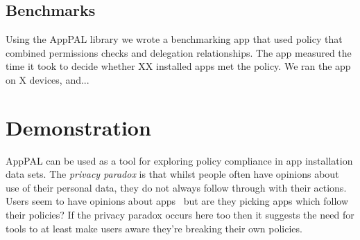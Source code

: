 \documentclass[]{llncs}
\begin{document}
%
%

\subsection{Benchmarks}
\label{ssec:benchmarks}

Using the AppPAL library we wrote a benchmarking app that used policy that combined permissions checks and delegation relationships.
The app measured the time it took to decide whether XX installed apps met the policy.
We ran the app on X devices, and...


\section{Demonstration}
\label{sec:demonstation}

AppPAL can be used as a tool for exploring policy compliance in app installation data sets.
The \emph{privacy paradox} is that whilst people often have opinions about use of their personal data, they do not always follow through with their actions.
Users seem to have opinions about apps~\cite{Sadeh:2014vq} but are they picking apps which follow their policies?
If the privacy paradox occurs here too then it suggests the need for tools to at least make users aware they're breaking their own policies.
\end{document}
